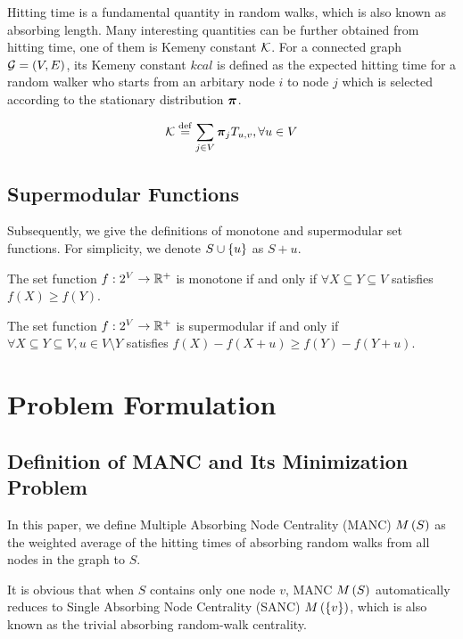 \documentclass[sigconf]{acmart}
\begin{document}
Hitting time is a fundamental quantity in random walks, which is also known as absorbing length.
Many interesting quantities can be further obtained from hitting time, one of them is Kemeny constant \(\mathcal{K}\).
For a connected graph \(\mathcal{G}=(V,E)\), its Kemeny constant \(kcal\) is defined as the expected hitting time for a random walker who starts from an arbitary node \(i\) to node \(j\) which is selected according to the stationary distribution \(\boldsymbol{\pi}\).
\begin{definition}
    \[\mathcal{K}\stackrel{\mathrm{def}}{=}\sum_{j\in V}\boldsymbol{\pi}_jT_{u,v},\forall u\in V\]
\end{definition}

\subsection{Supermodular Functions}

Subsequently, we give the definitions of monotone and supermodular set functions. For simplicity, we denote \(S\cup\left\{u \right\}\) as \(S+u\).

\begin{definition}[Monotonicity]
    The set function \(f:2^{V}\to\mathbb{R}^+\) is monotone if and only if \(\forall X\subseteq Y\subseteq V\) satisfies \(f(X)\ge f(Y)\).
\end{definition}

\begin{definition}[Supermodularity]
    The set function \(f:2^{V}\to\mathbb{R}^+\) is supermodular if and only if \(\forall X\subseteq Y\subseteq V, u\in V\setminus Y\) satisfies \(f(X)-f(X+u)\ge f(Y)-f(Y+u)\).
\end{definition}

\section{Problem Formulation}\label{sec:prob-form}

\subsection{Definition of MANC and Its Minimization Problem}

In this paper, we define Multiple Absorbing Node Centrality (MANC) \(M\left(S\right)\) as the weighted average of the hitting times of absorbing random walks from all nodes in the graph to \(S\).

It is obvious that when \(S\) contains only one node \(v\), MANC \(M\left(S\right)\) automatically reduces to Single Absorbing Node Centrality (SANC) \(M\left(\left\{v \right\}\right)\), which is also known as the trivial absorbing random-walk centrality.
\end{document}
